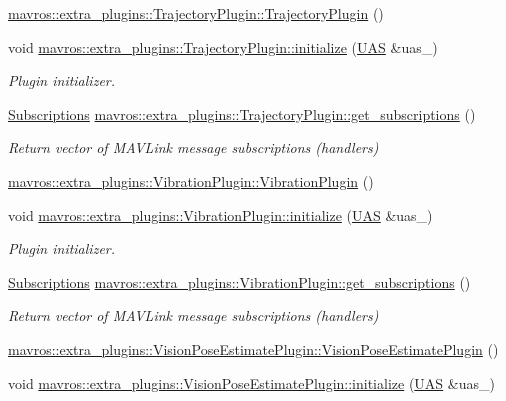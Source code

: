 \begin{DoxyCompactItemize}
\mbox{\hyperlink{group__plugin_ga97ea75d091e826ffb7445dd2f4863880}{mavros\+::extra\+\_\+plugins\+::\+Trajectory\+Plugin\+::\+Trajectory\+Plugin}} ()
\item 
void \mbox{\hyperlink{group__plugin_ga2a6372c5c89e9910eb979bc01a257609}{mavros\+::extra\+\_\+plugins\+::\+Trajectory\+Plugin\+::initialize}} (\mbox{\hyperlink{classmavros_1_1UAS}{U\+AS}} \&uas\+\_\+)
\begin{DoxyCompactList}\small\item\em Plugin initializer. \end{DoxyCompactList}\item 
\mbox{\hyperlink{group__plugin_ga8967d61fc77040e0c3ea5a4585d62a09}{Subscriptions}} \mbox{\hyperlink{group__plugin_gaae780d771bd0792a591dc341783cf8de}{mavros\+::extra\+\_\+plugins\+::\+Trajectory\+Plugin\+::get\+\_\+subscriptions}} ()
\begin{DoxyCompactList}\small\item\em Return vector of M\+A\+V\+Link message subscriptions (handlers) \end{DoxyCompactList}\item 
\mbox{\hyperlink{group__plugin_ga53355fa4e5a753bea611c2c7f0ee3cf2}{mavros\+::extra\+\_\+plugins\+::\+Vibration\+Plugin\+::\+Vibration\+Plugin}} ()
\item 
void \mbox{\hyperlink{group__plugin_gaa344b18446d091fdcc0d29f71de47b59}{mavros\+::extra\+\_\+plugins\+::\+Vibration\+Plugin\+::initialize}} (\mbox{\hyperlink{classmavros_1_1UAS}{U\+AS}} \&uas\+\_\+)
\begin{DoxyCompactList}\small\item\em Plugin initializer. \end{DoxyCompactList}\item 
\mbox{\hyperlink{group__plugin_ga8967d61fc77040e0c3ea5a4585d62a09}{Subscriptions}} \mbox{\hyperlink{group__plugin_gaf1faf27433bea5d716042d52aeaee805}{mavros\+::extra\+\_\+plugins\+::\+Vibration\+Plugin\+::get\+\_\+subscriptions}} ()
\begin{DoxyCompactList}\small\item\em Return vector of M\+A\+V\+Link message subscriptions (handlers) \end{DoxyCompactList}\item 
\mbox{\hyperlink{group__plugin_ga5a78aaf3ee493b641c7ae03f3f625f37}{mavros\+::extra\+\_\+plugins\+::\+Vision\+Pose\+Estimate\+Plugin\+::\+Vision\+Pose\+Estimate\+Plugin}} ()
\item 
void \mbox{\hyperlink{group__plugin_gac952eeee9513bc64dffeec777c8404dc}{mavros\+::extra\+\_\+plugins\+::\+Vision\+Pose\+Estimate\+Plugin\+::initialize}} (\mbox{\hyperlink{classmavros_1_1UAS}{U\+AS}} \&uas\+\_\+)

\end{DoxyCompactItemize}
